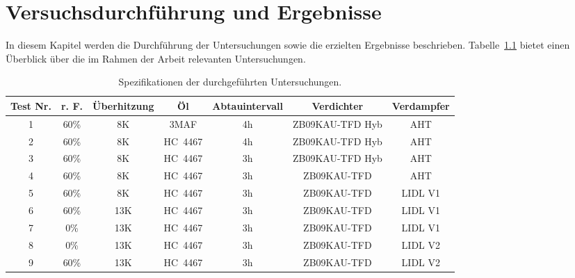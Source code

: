 
\chapter{Versuchsdurchführung und Ergebnisse}
\label{cha:Versuchsdurchführung}

In diesem Kapitel werden die Durchführung der Untersuchungen sowie die erzielten Ergebnisse beschrieben. Tabelle~\ref{tab:alltests} bietet einen Überblick über die im Rahmen der Arbeit relevanten Untersuchungen.

\begin{table}[h!]
\centering
\caption{Spezifikationen der durchgeführten Untersuchungen.}
\label{tab:alltests}
\begin{tabular}{|ccccccc|}
\hline
Test Nr.              & r. F.                     & Überhitzung              & Öl                               & Abtauintervall          & Verdichter                           & Verdampfer \\ \hline
\multicolumn{1}{|c|}{1} & \multicolumn{1}{c|}{60\%} & \multicolumn{1}{c|}{8K}  & \multicolumn{1}{c|}{3MAF}        & \multicolumn{1}{c|}{4h} & \multicolumn{1}{c|}{ZB09KAU-TFD Hyb} & AHT        \\
\multicolumn{1}{|c|}{2} & \multicolumn{1}{c|}{60\%} & \multicolumn{1}{c|}{8K}  & \multicolumn{1}{c|}{HC~4467} & \multicolumn{1}{c|}{4h} & \multicolumn{1}{c|}{ZB09KAU-TFD Hyb} & AHT        \\
\multicolumn{1}{|c|}{3} & \multicolumn{1}{c|}{60\%} & \multicolumn{1}{c|}{8K}  & \multicolumn{1}{c|}{HC~4467} & \multicolumn{1}{c|}{3h} & \multicolumn{1}{c|}{ZB09KAU-TFD Hyb} & AHT        \\
\multicolumn{1}{|c|}{4} & \multicolumn{1}{c|}{60\%} & \multicolumn{1}{c|}{8K}  & \multicolumn{1}{c|}{HC~4467} & \multicolumn{1}{c|}{3h} & \multicolumn{1}{c|}{ZB09KAU-TFD}     & AHT        \\
\multicolumn{1}{|c|}{5} & \multicolumn{1}{c|}{60\%} & \multicolumn{1}{c|}{8K}  & \multicolumn{1}{c|}{HC~4467} & \multicolumn{1}{c|}{3h} & \multicolumn{1}{c|}{ZB09KAU-TFD}     & LIDL V1    \\
\multicolumn{1}{|c|}{6} & \multicolumn{1}{c|}{60\%} & \multicolumn{1}{c|}{13K} & \multicolumn{1}{c|}{HC~4467} & \multicolumn{1}{c|}{3h} & \multicolumn{1}{c|}{ZB09KAU-TFD}     & LIDL V1    \\
\multicolumn{1}{|c|}{7} & \multicolumn{1}{c|}{0\%}  & \multicolumn{1}{c|}{13K} & \multicolumn{1}{c|}{HC~4467} & \multicolumn{1}{c|}{3h} & \multicolumn{1}{c|}{ZB09KAU-TFD}     & LIDL V1    \\
\multicolumn{1}{|c|}{8} & \multicolumn{1}{c|}{0\%}  & \multicolumn{1}{c|}{13K} & \multicolumn{1}{c|}{HC~4467} & \multicolumn{1}{c|}{3h} & \multicolumn{1}{c|}{ZB09KAU-TFD}     & LIDL V2    \\
\multicolumn{1}{|c|}{9} & \multicolumn{1}{c|}{60\%} & \multicolumn{1}{c|}{13K} & \multicolumn{1}{c|}{HC~4467} & \multicolumn{1}{c|}{3h} & \multicolumn{1}{c|}{ZB09KAU-TFD}     & LIDL V2    \\ \hline
\end{tabular}
\end{table}
